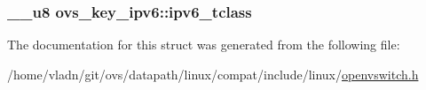 \subsubsection[{ipv6\+\_\+tclass}]{\setlength{\rightskip}{0pt plus 5cm}\+\_\+\+\_\+u8 ovs\+\_\+key\+\_\+ipv6\+::ipv6\+\_\+tclass}\label{structovs__key__ipv6_a391295d87ca76a365cc78fd92c4e4615}


The documentation for this struct was generated from the following file\+:\begin{DoxyCompactItemize}
\item 
/home/vladn/git/ovs/datapath/linux/compat/include/linux/\hyperlink{openvswitch_8h}{openvswitch.\+h}\end{DoxyCompactItemize}
